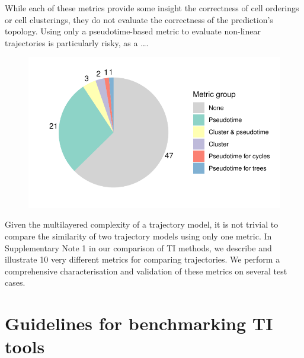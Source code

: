While each of these metrics provide some insight the correctness of cell orderings or cell clusterings, they do not evaluate the correctness of the prediction's topology. Using only a pseudotime-based metric to evaluate non-linear trajectories is particularly risky, as a \ldots. 

\begin{figure}[htb!]
	\centering
	\includegraphics[width=.5\linewidth]{fig/metrics.pdf} 
	\caption{}
	\label{fig:metrics}
\end{figure}


Given the multilayered complexity of a trajectory model, it is not trivial to compare the similarity of two trajectory models using only one metric. In Supplementary Note 1 in our comparison of TI methods\cite{saelens_comparisonsinglecelltrajectory_2019}, we describe and illustrate 10 very different metrics for comparing trajectories. We perform a comprehensive characterisation and validation of these metrics on several test cases. 


\section{Guidelines for benchmarking TI tools}

